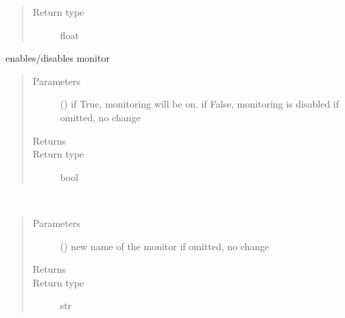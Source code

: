 \documentclass[letterpaper,10pt,english]{sphinxmanual}
\begin{document}
\begin{fulllineitems}
\begin{fulllineitems}
\begin{quote}
\begin{description}
\item[{Return type}] \leavevmode
float

\end{description}\end{quote}

\end{fulllineitems}


\begin{fulllineitems}
\label{\detokenize{Reference:salabim.Monitor.monitor}}
enables/disables monitor
\begin{quote}\begin{description}
\item[{Parameters}] \leavevmode
{} () \textendash{} if True, monitoring will be on. 
if False, monitoring is disabled 
if omitted, no change

\item[{Returns}] \leavevmode
{}

\item[{Return type}] \leavevmode
bool

\end{description}\end{quote}

\end{fulllineitems}


\begin{fulllineitems}
\label{\detokenize{Reference:salabim.Monitor.name}}~\begin{quote}\begin{description}
\item[{Parameters}] \leavevmode
{} () \textendash{} new name of the monitor
if omitted, no change

\item[{Returns}] \leavevmode
{}

\item[{Return type}] \leavevmode
str

\end{description}\end{quote}


\end{fulllineitems}
\end{fulllineitems}
\end{document}

